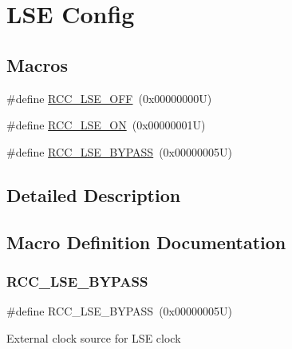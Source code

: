 \hypertarget{group___r_c_c___l_s_e___config}{}\section{L\+SE Config}
\label{group___r_c_c___l_s_e___config}
\subsection*{Macros}
\begin{DoxyCompactItemize}
\item 
\#define \hyperlink{group___r_c_c___l_s_e___config_ga6645c27708d0cad1a4ab61d2abb24c77}{R\+C\+C\+\_\+\+L\+S\+E\+\_\+\+O\+FF}~(0x00000000\+U)
\item 
\#define \hyperlink{group___r_c_c___l_s_e___config_gac981ea636c2f215e4473901e0912f55a}{R\+C\+C\+\_\+\+L\+S\+E\+\_\+\+ON}~(0x00000001\+U)
\item 
\#define \hyperlink{group___r_c_c___l_s_e___config_gaad580157edbae878edbcc83c5a68e767}{R\+C\+C\+\_\+\+L\+S\+E\+\_\+\+B\+Y\+P\+A\+SS}~(0x00000005\+U)
\end{DoxyCompactItemize}


\subsection{Detailed Description}


\subsection{Macro Definition Documentation}
\mbox{\label{group___r_c_c___l_s_e___config_gaad580157edbae878edbcc83c5a68e767}} 
\subsubsection{\texorpdfstring{R\+C\+C\+\_\+\+L\+S\+E\+\_\+\+B\+Y\+P\+A\+SS}{RCC\_LSE\_BYPASS}}
{\footnotesize\ttfamily \#define R\+C\+C\+\_\+\+L\+S\+E\+\_\+\+B\+Y\+P\+A\+SS~(0x00000005\+U)}

External clock source for L\+SE clock \mbox{\label{group___r_c_c___l_s_e___config_ga6645c27708d0cad1a4ab61d2abb24c77}} 
